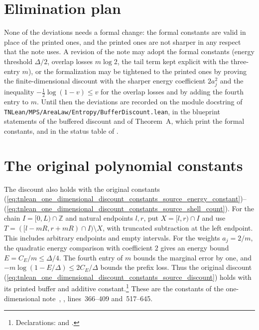 \documentclass{article}
\begin{document}
\section{Elimination plan}

None of the deviations needs a formal change: the formal constants are valid
in place of the printed ones, and the printed ones are not sharper in any
respect that the note uses. A revision of the note may adopt the formal
constants (energy threshold $\Delta/2$, overlap losses $m\log2$, the tail
term kept explicit with the three-entry $m$), or the formalization may be
tightened to the printed ones by proving the finite-dimensional discount with
the sharper energy coefficient $2a_j^2$ and the inequality
$-\frac12\log(1-v)\le v$ for the overlap losses and by adding the fourth
entry to $m$. Until then the deviations are recorded on the module docstring
of \texttt{TNLean/MPS/AreaLaw/Entropy/BufferDiscount.lean}, in the blueprint statements of
the buffered discount and of Theorem~A, which print the formal constants, and
in the status table of .

\section{The original polynomial constants}

The discount also holds with the original constants
(\ref{eq:tnlean_one_dimensional_discount_constants_source_energy_constant})--
(\ref{eq:tnlean_one_dimensional_discount_constants_source_shell_count}).
For the chain $I=[0,L)\cap\mathbb Z$ and natural endpoints $l,r$,
put $X=[l,r)\cap I$ and use
$T=([l-mR,r+mR)\cap I)\setminus X$, with truncated subtraction
at the left endpoint. This includes arbitrary endpoints and empty intervals.
For the weights $a_j=2/m$, the quadratic energy comparison with coefficient
$2$ gives an energy bound $E=C_E/m\le\Delta/4$.
The fourth entry of $m$ bounds the marginal error by one, and
$-m\log(1-E/\Delta)\le2C_E/\Delta$ bounds the prefix loss.
Thus the original discount
(\ref{eq:tnlean_one_dimensional_discount_constants_source_discount})
holds with its printed buffer and additive constant.\footnote{Declarations:
     and
    .}
These are the constants of the one-dimensional note~\cite{TNLean2026OneDimensional},
, lines~366--409 and~517--645.
\end{document}
